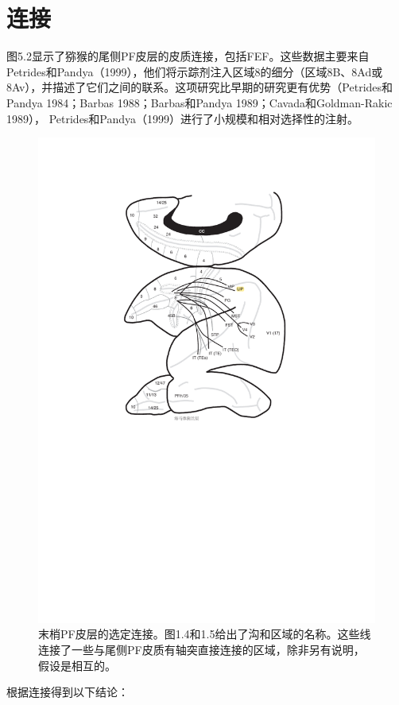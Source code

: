 \section{连接}
图5.2显示了猕猴的尾侧PF皮层的皮质连接，包括FEF。这些数据主要来自Petrides和Pandya（1999），他们将示踪剂注入区域8的细分（区域8B、8Ad或8Av），并描述了它们之间的联系。这项研究比早期的研究更有优势（Petrides和Pandya 1984；Barbas 1988；Barbas和Pandya 1989；Cavada和Goldman-Rakic 1989）， Petrides和Pandya（1999）进行了小规模和相对选择性的注射。
\begin{figure}
	\centering
	\includegraphics[width=0.7\linewidth]{image_pfc/Fig_5_2}
	\caption{末梢PF皮层的选定连接。图1.4和1.5给出了沟和区域的名称。这些线连接了一些与尾侧PF皮质有轴突直接连接的区域，除非另有说明，假设是相互的。}
	\label{fig:fig}
\end{figure}


根据连接得到以下结论：

